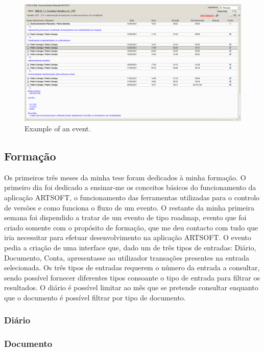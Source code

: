 \documentclass[sigplan]{acmart}
\begin{document}
\begin{figure}[htbp]
	\centerline{\includegraphics[width=\linewidth]{figures/evento_formacao.png}}
	\caption{Example of an event.}
	\label{fig1}
\end{figure}

\subsection{Formação}

Os primeiros três meses da minha tese foram dedicados à minha formação. O primeiro dia foi dedicado a ensinar-me os conceitos básicos do funcionamento da aplicação ARTSOFT, o funcionamento das ferramentas utilizadas para o controlo de versões e como funciona o fluxo de um evento. O restante da minha primeira semana foi dispendido a tratar de um evento de tipo roadmap, evento que foi criado somente com o propósito de formação, que me deu contacto com tudo que iria necessitar para efetuar desenvolvimento na aplicação ARTSOFT. O evento pedia a criação de uma interface que, dado um de três tipos de entradas: Diário, Documento, Conta, apresentasse ao utilizador transações presentes na entrada selecionada. Os três tipos de entradas requerem o número da entrada a consultar, sendo possível fornecer diferentes tipos consoante o tipo de entrada para filtrar os resultados. O diário é possível limitar ao mês que se pretende consultar enquanto que o documento é possível filtrar por tipo de documento.

\subsubsection{Diário}

\subsubsection{Documento}
\end{document}

